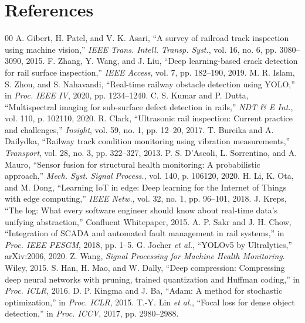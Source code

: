 \documentclass[conference]{IEEEtran}
\begin{document}
\section*{References}
\begin{thebibliography}{00}
 A. Gibert, H. Patel, and V. K. Asari, ``A survey of railroad track inspection using machine vision,'' \emph{IEEE Trans. Intell. Transp. Syst.}, vol. 16, no. 6, pp. 3080--3090, 2015.
 F. Zhang, Y. Wang, and J. Liu, ``Deep learning-based crack detection for rail surface inspection,'' \emph{IEEE Access}, vol. 7, pp. 182--190, 2019.
 M. R. Islam, S. Zhou, and S. Nahavandi, ``Real-time railway obstacle detection using YOLO,'' in \emph{Proc. IEEE IV}, 2020, pp. 1234--1240.
 C. S. Kumar and P. Dutta, ``Multispectral imaging for sub-surface defect detection in rails,'' \emph{NDT \& E Int.}, vol. 110, p. 102110, 2020.
 R. Clark, ``Ultrasonic rail inspection: Current practice and challenges,'' \emph{Insight}, vol. 59, no. 1, pp. 12--20, 2017.
 T. Bureika and A. Dailydka, ``Railway track condition monitoring using vibration measurements,'' \emph{Transport}, vol. 28, no. 3, pp. 322--327, 2013.
 P. S. D'Ascoli, L. Sorrentino, and A. Mauro, ``Sensor fusion for structural health monitoring: A probabilistic approach,'' \emph{Mech. Syst. Signal Process.}, vol. 140, p. 106120, 2020.
 H. Li, K. Ota, and M. Dong, ``Learning IoT in edge: Deep learning for the Internet of Things with edge computing,'' \emph{IEEE Netw.}, vol. 32, no. 1, pp. 96--101, 2018.
 J. Kreps, ``The log: What every software engineer should know about real-time data's unifying abstraction,'' Confluent Whitepaper, 2015.
 A. P. Sakr and J. H. Chow, ``Integration of SCADA and automated fault management in rail systems,'' in \emph{Proc. IEEE PESGM}, 2018, pp. 1--5.
 G. Jocher \emph{et al.}, ``YOLOv5 by Ultralytics,'' arXiv:2006, 2020.
 Z. Wang, \emph{Signal Processing for Machine Health Monitoring}. Wiley, 2015.
 S. Han, H. Mao, and W. Dally, ``Deep compression: Compressing deep neural networks with pruning, trained quantization and Huffman coding,'' in \emph{Proc. ICLR}, 2016.
 D. P. Kingma and J. Ba, ``Adam: A method for stochastic optimization,'' in \emph{Proc. ICLR}, 2015.
 T.-Y. Lin \emph{et al.}, ``Focal loss for dense object detection,'' in \emph{Proc. ICCV}, 2017, pp. 2980--2988.

\end{thebibliography}
\end{document}

